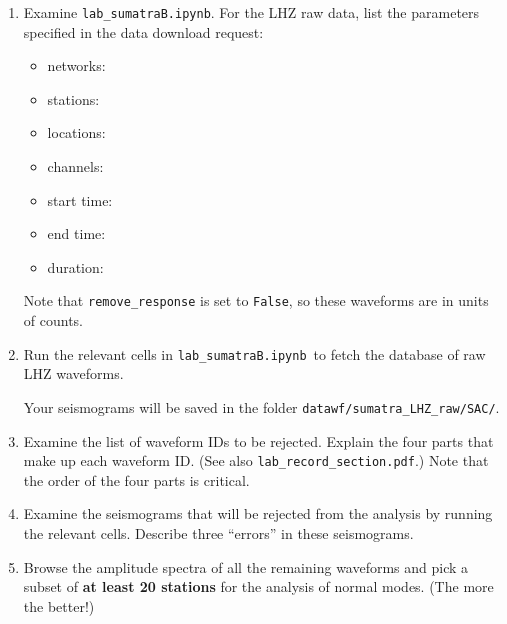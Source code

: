 \documentclass[11pt,titlepage,fleqn]{article}
\newcommand{\tfile}{{\tt lab\_sumatraB.ipynb}}
\begin{document}
\begin{enumerate}
\item Examine \tfile. For the LHZ raw data, list the parameters specified in the data download request:

\begin{itemize}
\item networks: 
\item stations: 
\item locations: 
\item channels: 
\item start time: 
\item end time: 
\item duration: 
\end{itemize}

Note that \verb+remove_response+ is set to \verb+False+, so these waveforms are in units of counts.



\item Run the relevant cells in \tfile\ to fetch the database of raw LHZ waveforms.

Your seismograms will be saved in the folder \verb+datawf/sumatra_LHZ_raw/SAC/+.

\item Examine the list of waveform IDs to be rejected. Explain the four parts that make up each waveform ID. (See also \verb+lab_record_section.pdf+.) Note that the order of the four parts is critical.

\item Examine the seismograms that will be rejected from the analysis by running the relevant cells. Describe three ``errors'' in these seismograms.


\item Browse the amplitude spectra of all the remaining waveforms and pick a subset of {\bf at least 20 stations} for the analysis of normal modes. (The more the better!)


\end{enumerate}
\end{document}
